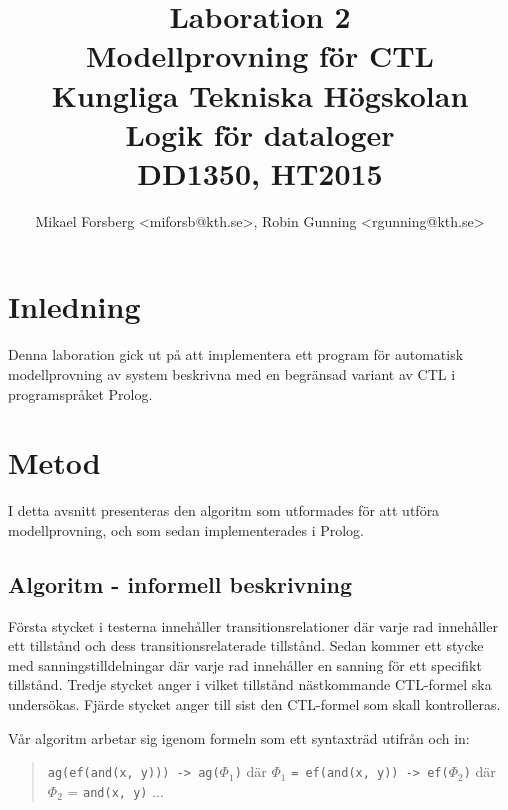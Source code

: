 \documentclass[a4paper,11pt]{article}
\begin{document}
\title{Laboration 2\\ Modellprovning för CTL\\ \vspace{0.2cm} \small Kungliga Tekniska Högskolan\\ Logik för dataloger\\ DD1350, HT2015}
\author{Mikael Forsberg <miforsb@kth.se>, Robin Gunning <rgunning@kth.se>}
\maketitle
\newpage

\tableofcontents
\newpage

\section{Inledning}
Denna laboration gick ut på att implementera ett program för automatisk
modellprovning av system beskrivna med en begränsad variant av CTL i
programspråket Prolog.

\section{Metod}
I detta avsnitt presenteras den algoritm som utformades för att
utföra modellprovning, och som sedan implementerades i Prolog.

\subsection{Algoritm - informell beskrivning}
Första stycket i testerna innehåller transitionsrelationer där 
varje rad innehåller ett tillstånd och dess transitionsrelaterade tillstånd.
Sedan kommer ett stycke med sanningstilldelningar där varje rad 
innehåller en sanning för ett specifikt tillstånd. 
Tredje stycket anger i vilket tillstånd nästkommande CTL-formel ska
undersökas.
Fjärde stycket anger till sist den CTL-formel som skall kontrolleras.

\bigskip
\noindent
Vår algoritm arbetar sig igenom formeln som ett syntaxträd utifrån och in:

\begin{quote}
\texttt{ag(ef(and(x, y))) -> ag(}$\Phi_1$\texttt{)} där $\Phi_1$ \texttt{= ef(and(x, y)) -> ef(}$\Phi_2$\texttt{)} där $\Phi_2$ = \texttt{and(x, y)} ...
\end{quote}
\end{document}
